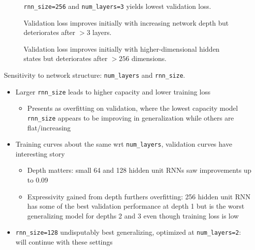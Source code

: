 \begin{figure}[tb]
    \centering
    
    \caption{\texttt{rnn\_size=256} and \texttt{num\_layers=3} yields lowest validation loss.}
    \label{fig:torch-rnn-network-params}
\end{figure}

\begin{figure}[tb]
  \centering
  
  \caption{Validation loss improves initially with increasing network depth but deteriorates after $>3$ layers.}
  \label{fig:torch-rnn-network-params-num-layers}
\end{figure}

\begin{figure}[tb]
  \centering
  
  \caption{Validation loss improves initially with higher-dimensional hidden states
  but deteriorates after $>256$ dimensions.}
  \label{fig:torch-rnn-network-params-rnn-size}
\end{figure}

Sensitivity to network structure: \texttt{num\_layers} and \texttt{rnn\_size}.
\begin{itemize}
    \item Larger \texttt{rnn\_size} leads to higher capacity and lower training loss
        \begin{itemize}
            \item Presents as overfitting on validation, where the lowest capacity
                model \texttt{rnn\_size} appears to be improving in generalization while
                others are flat/increasing
        \end{itemize}
    \item Training curves about the same wrt \texttt{num\_layers}, validation curves have interesting story
        \begin{itemize}
            \item Depth matters: small 64 and 128 hidden unit RNNs saw improvements up to 0.09
            \item Expressivity gained from depth furthers overfitting: 256
                hidden unit RNN has some of the best validation performance at
                depth 1 but is the worst generalizing model for depths 2
                and 3 even though training loss is low
        \end{itemize}
    \item \texttt{rnn\_size=128} undisputably best generalizing, optimized at
        \texttt{num\_layers=2}: will continue with these settings
\end{itemize}

